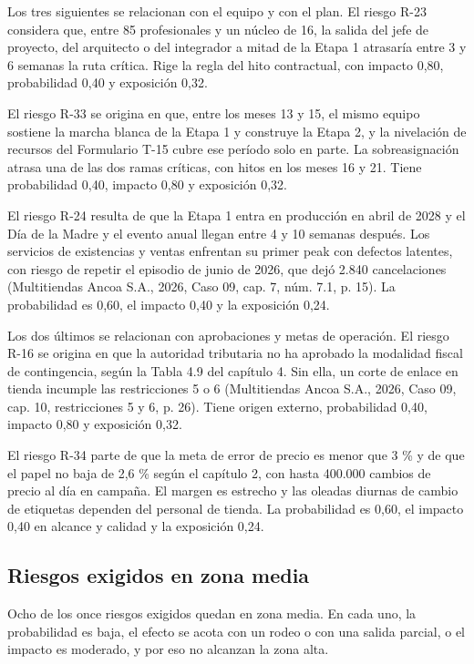 \documentclass[11pt]{article}
\begin{document}
Los tres siguientes se relacionan con el equipo y con el plan. El riesgo R-23 considera que, entre 85 profesionales y un núcleo de 16, la salida del jefe de proyecto, del arquitecto o del integrador a mitad de la Etapa 1 atrasaría entre 3 y 6 semanas la ruta crítica. Rige la regla del hito contractual, con impacto 0,80, probabilidad 0,40 y exposición 0,32.

El riesgo R-33 se origina en que, entre los meses 13 y 15, el mismo equipo sostiene la marcha blanca de la Etapa 1 y construye la Etapa 2, y la nivelación de recursos del Formulario T-15 cubre ese período solo en parte. La sobreasignación atrasa una de las dos ramas críticas, con hitos en los meses 16 y 21. Tiene probabilidad 0,40, impacto 0,80 y exposición 0,32.

El riesgo R-24 resulta de que la Etapa 1 entra en producción en abril de 2028 y el Día de la Madre y el evento anual llegan entre 4 y 10 semanas después. Los servicios de existencias y ventas enfrentan su primer peak con defectos latentes, con riesgo de repetir el episodio de junio de 2026, que dejó 2.840 cancelaciones (Multitiendas Ancoa S.A., 2026, Caso 09, cap. 7, núm. 7.1, p. 15). La probabilidad es 0,60, el impacto 0,40 y la exposición 0,24.

Los dos últimos se relacionan con aprobaciones y metas de operación. El riesgo R-16 se origina en que la autoridad tributaria no ha aprobado la modalidad fiscal de contingencia, según la Tabla 4.9 del capítulo 4. Sin ella, un corte de enlace en tienda incumple las restricciones 5 o 6 (Multitiendas Ancoa S.A., 2026, Caso 09, cap. 10, restricciones 5 y 6, p. 26). Tiene origen externo, probabilidad 0,40, impacto 0,80 y exposición 0,32.

El riesgo R-34 parte de que la meta de error de precio es menor que 3 \% y de que el papel no baja de 2,6 \% según el capítulo 2, con hasta 400.000 cambios de precio al día en campaña. El margen es estrecho y las oleadas diurnas de cambio de etiquetas dependen del personal de tienda. La probabilidad es 0,60, el impacto 0,40 en alcance y calidad y la exposición 0,24.

\subsection{Riesgos exigidos en zona media}

Ocho de los once riesgos exigidos quedan en zona media. En cada uno, la probabilidad es baja, el efecto se acota con un rodeo o con una salida parcial, o el impacto es moderado, y por eso no alcanzan la zona alta.
\end{document}
